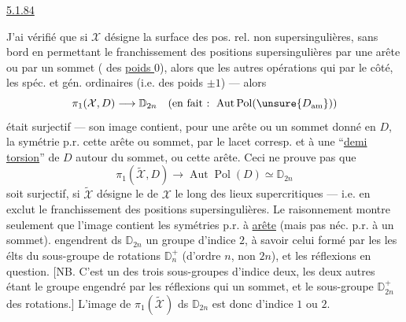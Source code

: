 {}
\uline{5.1.84}

J'ai vérifié que si $\mathcal X$ désigne la
surface des pos. rel. non supersingulières,
sans bord en permettant le franchissement
des positions supersingulières
par une arête ou par un sommet
( des \uline{poids $0$}), alors que les
autres opérations qui 
par le côté,  les spéc. et gén.
ordinaires (i.e. des poids $\pm1$) --- alors
\[
\pi_1(\mathcal X,D)\longrightarrow\mathbb D_{2n}
\quad\text{(en fait : }\operatorname{Aut}\operatorname{Pol}(\unsure{D_{\mathrm{am}}})\text{)}
\]
était surjectif --- son image contient,
pour une arête ou un  sommet
donné en $D$, la symétrie p.r.
cette arête ou sommet, par le lacet
corresp. et à une ``\uline{demi torsion}'' de $D$
autour du  sommet, ou cette
arête. Ceci ne prouve pas que
\[
\pi_1(\widetilde{\mathcal X},D)\longrightarrow
\operatorname{Aut}\operatorname{Pol}(D)\simeq\mathbb D_{2n}
\]
soit surjectif, si $\widetilde{\mathcal X}$ désigne le 
de $\mathcal X$ le long des lieux supercritiques
--- i.e. en exclut le franchissement des
positions supersingulières. Le raisonnement
montre seulement que l'image contient
les symétries p.r. à  \uline{arête} (mais pas
néc. p.r. à un sommet). 
engendrent ds $\mathbb D_{2n}$ un  groupe
d'indice $2$, à savoir celui formé par les
 les élts du sous-groupe
de rotations $\mathbb D_n^+$ (d'ordre \uline{$n$}, non $2n$),
et les réflexions en question. [NB. C'est
un des trois sous-groupes d'indice deux,
les deux autres étant le groupe engendré
par les  réflexions qui  
un sommet, et le sous-groupe $\mathbb D_{2n}^+$
des rotations.] L'image de $\pi_1(\widetilde{\mathcal X})$ ds $\mathbb D_{2n}$
est donc d'indice $1$ ou $2$.

